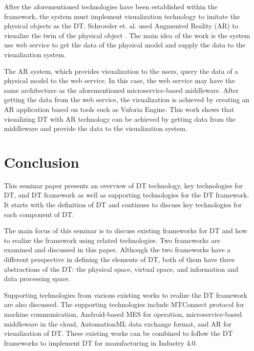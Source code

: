 \documentclass[article]{aaltoseries}
\begin{document}
After the aforementioned technologies have been established within the framework, the system must implement visualization technology to imitate the physical objects as the DT. Schroeder et. al. used Augmented Reality (AR) to visualize the twin of the physical object \cite{schroeder2016visualising}. The main idea of the work is the system use web service to get the data of the physical model and supply the data to the visualization system.

The AR system, which provides visualization to the users, query the data of a physical model to the web service. In this case, the web service may have the same architecture as the aforementioned microservice-based middleware. After getting the data from the web service, the visualization is achieved by creating an AR application based on tools such as Vuforia Engine. This work shows that visualizing DT with AR technology can be achieved by getting data from the middleware and provide the data to the visualization system.

\section{Conclusion}
This seminar paper presents an overview of DT technology, key technologies for DT, and DT framework as well as supporting technologies for the DT framework. It starts with the definition of DT and continues to discuss key technologies for each component of DT.

The main focus of this seminar is to discuss existing frameworks for DT and how to realize the framework using related technologies. Two frameworks are examined and discussed in this paper. Although the two frameworks have a different perspective in defining the elements of DT, both of them have three abstractions of the DT: the physical space, virtual space, and information and data processing space.

Supporting technologies from various existing works to realize the DT framework are also discussed. The supporting technologies include MTConnect protocol for machine communication, Android-based MES for operation, microservice-based middleware in the cloud, AutomationML data exchange format, and AR for visualization of DT. These existing works can be combined to follow the DT frameworks to implement DT for manufacturing in Industry 4.0.





\end{document}
